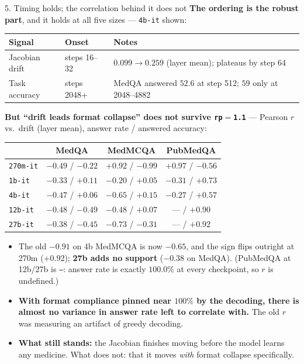 \documentclass[aspectratio=169,10pt]{beamer}
\newcommand{\bad}[1]{\textcolor{down}{#1}}
\begin{document}
\begin{frame}{5. Timing holds; the correlation behind it does not}
  \small
  \textbf{The ordering is the robust part}, and it holds at all five sizes ---
  \texttt{4b-it} shown:

  \vspace{0.4em}
  \centering
  {\footnotesize
  \begin{tabular}{lll}
    \toprule
    Signal & Onset & Notes \\
    \midrule
    Jacobian drift      & steps 16--32  & $0.099 \rightarrow 0.259$ (layer mean); plateaus by step 64 \\
    Task accuracy       & steps 2048+   & MedQA answered $52.6$ at step 512; $59$ only at 2048--4882 \\
    \bottomrule
  \end{tabular}}

  \vspace{0.8em}
  \bad{\textbf{But ``drift leads format collapse'' does not survive
  \texttt{rp}$=$\texttt{1.1}}} --- Pearson $r$ vs.\ drift (layer mean),
  answer rate / answered accuracy:

  \vspace{0.3em}
  \centering
  {\footnotesize
  \begin{tabular}{lccc}
    \toprule
    & MedQA & MedMCQA & PubMedQA \\
    \midrule
    \texttt{270m-it} & $-0.49$ / $-0.22$ & \bad{$\mathbf{+0.92}$} / $-0.99$ & $+0.97$ / $-0.56$ \\
    \texttt{1b-it}   & $-0.33$ / $+0.11$ & $-0.20$ / $+0.05$ & $-0.31$ / $+0.73$ \\
    \texttt{4b-it}   & $-0.47$ / $+0.06$ & $-0.65$ / $+0.15$ & $-0.27$ / $+0.57$ \\
    \texttt{12b-it}  & $-0.48$ / $-0.49$ & $-0.48$ / $+0.07$ & --- / $+0.90$ \\
    \texttt{27b-it}  & $-0.38$ / $-0.45$ & $-0.73$ / $-0.31$ & --- / $+0.92$ \\
    \bottomrule
  \end{tabular}}

  \vspace{0.5em}
  {\footnotesize
  \begin{itemize}\setlength{\itemsep}{0.1em}
    \item The old $\mathbf{-0.91}$ on 4b MedMCQA is now $-0.65$, and the sign
      \bad{flips outright at 270m} ($+0.92$); \textbf{27b adds no support}
      ($-0.38$ on MedQA). (PubMedQA at 12b/27b is \texttt{---}: answer rate is
      exactly $100.0\%$ at every checkpoint, so $r$ is undefined.)
    \item \textbf{With format compliance pinned near $100\%$ by the decoding,
      there is almost no variance in answer rate left to correlate with.} The
      old $r$ was measuring an artifact of greedy decoding.
    \item \textbf{What still stands:} the Jacobian finishes moving before the
      model learns any medicine. \bad{What does not:} that it moves \emph{with}
      format collapse specifically.
  \end{itemize}}
\end{frame}
\end{document}
